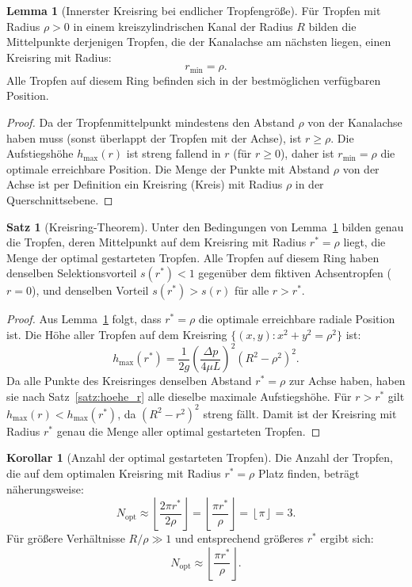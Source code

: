 ﻿\documentclass[a4paper,12pt]{article}
\theoremstyle{definition}
\newtheorem{satz}{Satz}
\newtheorem{lemma}{Lemma}
\newtheorem{korollar}{Korollar}
\begin{document}
\begin{lemma}[Innerster Kreisring bei endlicher Tropfengröße]
\label{lem:ring}
    Für Tropfen mit Radius $\rho > 0$ in einem kreiszylindrischen Kanal der Radius $R$
    bilden die Mittelpunkte derjenigen Tropfen, die der Kanalachse am nächsten liegen,
    einen Kreisring mit Radius:
    \[
    r_{\min} = \rho.
    \]
    Alle Tropfen auf diesem Ring befinden sich in der bestmöglichen verfügbaren Position.
\end{lemma}

\begin{proof}
    Da der Tropfenmittelpunkt mindestens den Abstand $\rho$ von der Kanalachse haben muss
    (sonst überlappt der Tropfen mit der Achse), ist $r \ge \rho$. Die Aufstiegshöhe
    $h_{\max}(r)$ ist streng fallend in $r$ (für $r \ge 0$), daher ist $r_{\min} = \rho$
    die optimale erreichbare Position. Die Menge der Punkte mit Abstand $\rho$ von der
    Achse ist per Definition ein Kreisring (Kreis) mit Radius $\rho$ in der Querschnittsebene. \qedhere
\end{proof}

\begin{satz}[Kreisring-Theorem]
\label{satz:kreisring}
    Unter den Bedingungen von Lemma~\ref{lem:ring} bilden genau die Tropfen,
    deren Mittelpunkt auf dem Kreisring mit Radius $r^* = \rho$ liegt, die Menge der
    optimal gestarteten Tropfen. Alle Tropfen auf diesem Ring haben denselben
    Selektionsvorteil $s(r^*) < 1$ gegenüber dem fiktiven Achsentropfen ($r = 0$),
    und denselben Vorteil $s(r^*) > s(r)$ für alle $r > r^*$.
\end{satz}

\begin{proof}
    Aus Lemma~\ref{lem:ring} folgt, dass $r^* = \rho$ die optimale erreichbare radiale
    Position ist. Die Höhe aller Tropfen auf dem Kreisring $\{(x,y) : x^2+y^2 = \rho^2\}$
    ist:
    \[
    h_{\max}(r^*) = \frac{1}{2g}\left(\frac{\Delta p}{4\mu L}\right)^2 (R^2 - \rho^2)^2.
    \]
    Da alle Punkte des Kreisringes denselben Abstand $r^* = \rho$ zur Achse haben,
    haben sie nach Satz~\ref{satz:hoehe_r} alle dieselbe maximale Aufstiegshöhe.
    Für $r > r^*$ gilt $h_{\max}(r) < h_{\max}(r^*)$, da $(R^2-r^2)^2$ streng fällt.
    Damit ist der Kreisring mit Radius $r^*$ genau die Menge aller optimal gestarteten
    Tropfen. \qedhere
\end{proof}

\begin{korollar}[Anzahl der optimal gestarteten Tropfen]
    Die Anzahl der Tropfen, die auf dem optimalen Kreisring mit Radius $r^* = \rho$ Platz
    finden, beträgt näherungsweise:
    \[
    N_{\text{opt}} \approx \left\lfloor \frac{2\pi r^*}{2\rho} \right\rfloor
    = \left\lfloor \frac{\pi r^*}{\rho} \right\rfloor = \left\lfloor \pi \right\rfloor = 3.
    \]
    Für größere Verhältnisse $R/\rho \gg 1$ und entsprechend größeres $r^*$ ergibt sich:
    \[
    N_{\text{opt}} \approx \left\lfloor \frac{\pi r^*}{\rho} \right\rfloor.
    \]
\end{korollar}
\end{document}
